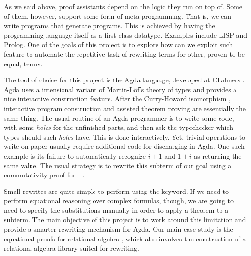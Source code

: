 As we said above, proof assistants depend on the logic they run on top of. Some of them,
however, support some form of meta programming. That is, we can write programs that generate
programs. This is achieved by having the programming language itself as a first class datatype.
Examples include LISP and Prolog. One of the goals of this project is to explore how can
we exploit such feature to automate the repetitive task of rewriting terms for other,
proven to be equal, terms.

The tool of choice for this project is the Agda language, developed at Chalmers \cite{norell07}. Agda uses a intensional
variant of Martin-L\"{o}f's theory of types and provides a nice interactive construction feature. After
the Curry-Howard isomorphism \cite{Howard01}, interactive program construction and assisted theorem proving are essentially
the same thing. The usual routine of an Agda programmer is to write some code, with some \emph{holes} for
the unfinished parts, and then ask the typechecker which types should such \emph{holes} have. This is done
interactively. Yet, trivial operations to write on paper usually require additional code
for discharging in Agda. One such example is its failure to automatically recognize $i + 1$ and
$1 + i$ as returning the same value. The usual strategy is to rewrite this subterm of our goal
using a commutativity proof for $+$. 

Small rewrites are quite simple to perform using the  keyword. If we need to perform
equational reasoning over complex formulas, though, we are going to need to specify the
substitutions manually in order to apply a theorem to a subterm. The main objective of this project is
to work around this limitation and provide a smarter rewriting mechanism for Agda. Our main 
case study is the equational proofs for relational algebra \cite{Bird97}, which also involves
the construction of a relational algebra library suited for rewriting.
